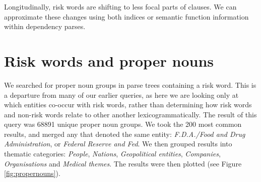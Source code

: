 

    \vspace{5mm}\noindent\begin{tcolorbox}[colback=yellow!5,colframe=yellow!40!black,title=Summary: risk and arguability]
    \parbox{1\textwidth}{%
    Longitudinally, risk words are shifting to less focal parts of clauses. We can approximate these changes using both indices or semantic function information within dependency parses.}
    \end{tcolorbox}
    \vspace{5mm}

\section{Risk words and proper nouns} \FloatBarrier

    We searched for proper noun groups in parse trees containing a risk word. This is a departure from many of our earlier queries, as here we are looking only at which entities co-occur with risk words, rather than determining how risk words and non-risk words relate to other another lexicogrammatically. The result of this query was 68891 unique proper noun groups. We took the 200 most common results, and merged any that denoted the same entity: \emph{F.D.A.\slash Food and Drug Administration}, or \emph{Federal Reserve and Fed}. We then grouped results into thematic categories: \emph{People}, \emph{Nations}, \emph{Geopolitical entities}, \emph{Companies}, \emph{Organisations} and \emph{Medical themes}. The results were then plotted (see Figure \ref{fig:propernouns}). 

